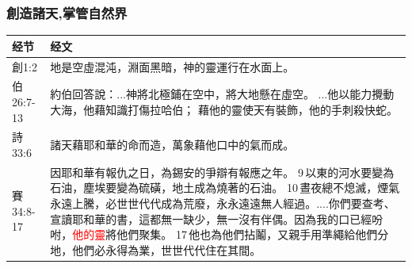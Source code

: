 \subsubsection{創造諸天,掌管自然界}
\begin{table}[H]
\centering
\begin{tabular}{p{6em}p{40em}}  \toprule
经节&经文 \\  \midrule
創1:2&地是空虛混沌，淵面黑暗，神的靈運行在水面上。\\  \midrule
伯26:7-13&約伯回答說：...神將北極鋪在空中，將大地懸在虛空。 ...他以能力攪動大海，他藉知識打傷拉哈伯； 藉他的靈使天有裝飾，他的手刺殺快蛇。\\  \midrule

詩33:6&諸天藉耶和華的命而造，萬象藉他口中的氣而成。\\  \midrule
賽34:8-17&因耶和華有報仇之日，為錫安的爭辯有報應之年。 9 以東的河水要變為石油，塵埃要變為硫磺，地土成為燒著的石油。 10 晝夜總不熄滅，煙氣永遠上騰，必世世代代成為荒廢，永永遠遠無人經過。....你們要查考、宣讀耶和華的書，這都無一缺少，無一沒有伴偶。因為我的口已經吩咐，\textcolor{red}{他的靈}將他們聚集。 17 他也為他們拈鬮，又親手用準繩給他們分地，他們必永得為業，世世代代住在其間。\\  \midrule
\end{tabular}%
\end{table}





